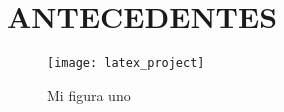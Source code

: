 \chapter{ANTECEDENTES}

\lipsum[1-1] \autocite{knuth:1984}

\begin{figure}[H]
	\centering
	\texttt{[image: latex\_project]}
	\caption{Mi figura uno}\label{fig:fig1}
\end{figure}